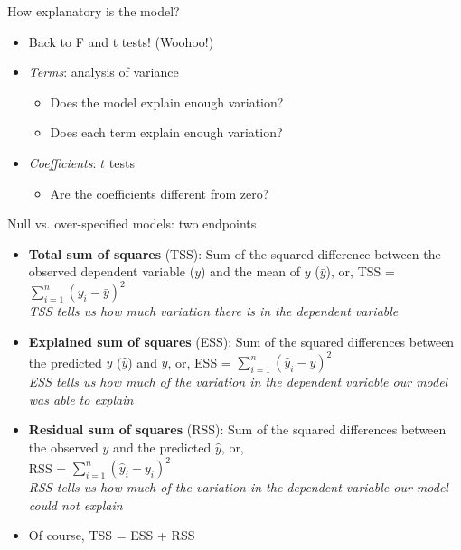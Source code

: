 \documentclass[xcolor=x11names,compress]{beamer}
\renewcommand{\(}{\begin{columns}}
\renewcommand{\)}{\end{columns}}
\newcommand{\<}[1]{\begin{column}{#1}}
\renewcommand{\>}{\end{column}}
\begin{document}
\begin{frame}{How explanatory is the model?}

\begin{center}
\begin{itemize}\itemsep20pt
\item Back to F and t tests! (Woohoo!)
\item {\it Terms}: analysis of variance
\begin{itemize}
\item Does the model explain enough variation?
\item Does each term explain enough variation?
\end{itemize}
\item {\it Coefficients}: $t$ tests
\begin{itemize}
\item Are the coefficients different from zero?
\end{itemize}
\end{itemize}

\end{center}
\end{frame}


\begin{frame}{Null vs. over-specified models: two endpoints}

\begin{itemize} \itemsep6pt

\item {\bf Total sum of squares} (TSS): Sum of the squared difference between the observed dependent variable ($y$) and the mean of $y$ ($\bar{y}$), or,		
 TSS = $\sum_{i=1}^{n}(y_i - \bar{y})^2$\\
{\it TSS tells us how much variation there is in the dependent variable}

\item {\bf Explained sum of squares} (ESS): Sum of the squared 
differences between the predicted $y$ ($\hat{y}$) and $\bar{y}$, or,
ESS = $\sum_{i=1}^{n} (\hat{y}_i - \bar{y})^2$\\

{\it ESS tells us how much of the variation in the dependent variable 
our model was able to explain}

\item {\bf Residual sum of squares} (RSS): Sum of the squared 
differences between the observed $y$ and the predicted $\hat{y}$, or, \\

RSS = $\sum_{i=1}^{n} (\hat{y}_i - y_i)^2$\\

{\it RSS tells us how much of the variation in the dependent variable 
our model could not explain}

\item Of course, TSS = ESS + RSS

\end{itemize}

\end{frame}
\end{document}
